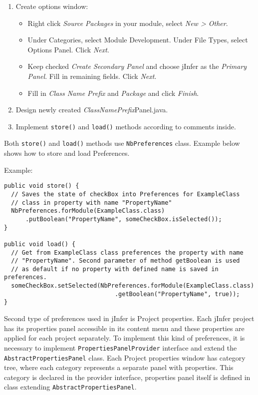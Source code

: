 \documentclass[a4paper,10pt,oneside]{article}
\def\.{\discretionary{}{}{}}
\begin{document}
\begin{enumerate}
 \item Create options window:
  \begin{itemize}
   \item Right click \textit{Source Packages} in your module,
                            select \textit{New > Other}.
   \item Under Categories, select Module Development. Under
                            File Types, select Options Panel. Click \textit{Next}.
   \item Keep checked \textit{Create Secondary Panel} and choose
                            jInfer as the \textit{Primary Panel}. Fill in remaining
                            fields. Click \textit{Next}.
   
   \item Fill in \textit{Class Name Prefix} and \textit{Package}
                            and click \textit{Finish}.
  \end{itemize}
 
 \item Design newly created \textit{ClassNamePrefix}Panel.java.
 \item Implement \texttt{store()} and \texttt{load()} methods according to comments inside.
\end{enumerate}
\par 
  Both \texttt{store()} and \texttt{load()} methods use
  \texttt{NbPreferences}
  class. Example below shows how to store and load Preferences.

\noindent Example:
\begin{verbatim}
public void store() {
  // Saves the state of checkBox into Preferences for ExampleClass
  // class in property with name "PropertyName"
  NbPreferences.forModule(ExampleClass.class)
      .putBoolean("PropertyName", someCheckBox.isSelected());
}

public void load() {
  // Get from ExampleClass class preferences the property with name
  // "PropertyName". Second parameter of method getBoolean is used
  // as default if no property with defined name is saved in preferences.
  someCheckBox.setSelected(NbPreferences.forModule(ExampleClass.class)
                               .getBoolean("PropertyName", true));
}
\end{verbatim}
\par 
  Second type of preferences used in jInfer is Project properties. Each jInfer
  project has its properties panel accessible in its content menu and
  these properties are applied for each project separately. To implement this
  kind of preferences, it is necessary to implement
  \texttt{Properties\.Panel\.Provider}
  interface and extend the
  \texttt{Abstract\.Properties\.Panel}
  class. Each Project properties window has category tree, where each category
  represents a separate panel with properties. This category is declared in the
  provider interface, properties panel itself is defined in class extending
  \texttt{AbstractPropertiesPanel}.
\end{document}
